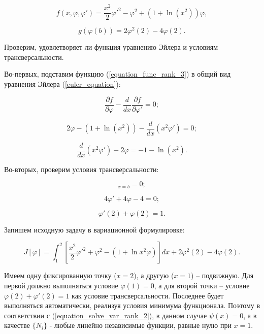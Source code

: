 \documentclass{article}
\begin{document}
\begin{equation}\label{equation_func_rank_3}
	f(x, \varphi, \varphi') = \frac{x^2}{2}\varphi'^2 - \varphi^2 + (1 + \ln(x^2))\varphi,
\end{equation}

\begin{equation}
	g(\varphi(b)) = 2\varphi^2(2) - 4\varphi(2).
\end{equation}

\noindent Проверим, удовлетворяет ли функция уравнению Эйлера и условиям трансверсальности.

Во-первых, подставим функцию (\ref{equation_func_rank_3}) в общий вид уравнения Эйлера (\ref{euler_equation}):

\begin{equation}
	\frac{\partial f}{\partial \varphi} - \frac{d}{dx} \frac{\partial f}{\partial \varphi'} = 0;
\end{equation}

\begin{equation}
	2\varphi - (1 + \ln(x^2)) - \frac{d}{dx}(x^2 \varphi') = 0;
\end{equation}

\begin{equation}
	\frac{d}{dx}(x^2 \varphi') - 2\varphi = -1 - \ln(x^2).
\end{equation}

Во-вторых, проверим условия трансверсальности:

\begin{equation}
	[\frac{\partial f}{\partial \varphi'} + \frac{\partial g}{\partial \varphi(b)}]_{x=b} = 0;
\end{equation}

\begin{equation}
	4\varphi' + 4\varphi - 4 = 0;
\end{equation}

\begin{equation}
	\varphi'(2) + \varphi(2) = 1.
\end{equation}

Запишем исходную задачу в вариационной формулировке:

\begin{equation}
	J[\varphi] = \int_{1}^{2} [\frac{x^2}{2}\varphi'^2 + \varphi^2 - (1 + \ln{x^2}\varphi)]dx + 2\varphi^2(2) - 4\varphi(2).
\end{equation}

Имеем одну фиксированную точку ($x = 2$), а другую ($x = 1$) – подвижную. Для первой должно выполняться условие $\varphi(1) = 0$, а для второй точки – условие $\varphi(2) + \varphi'(2) = 1$ как условие трансверсальности. Последнее будет выполняться автоматически, реализуя условия минимума функционала. Поэтому в соответствии с (\ref{equation_solve_var_rank_2}), в данном случае $\psi(x) = 0$, а в качестве $\lbrace N_{i} \rbrace$ - любые линейно независимые функции, равные нулю при $x = 1$.
\end{document}
